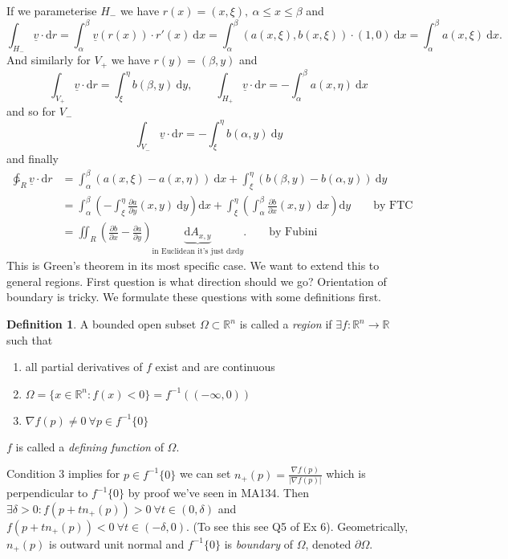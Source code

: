 \documentclass[a4paper]{article}
\theoremstyle{definition}
\newtheorem{defn}{Definition}[subsection]
\begin{document}
If we parameterise $H_{-}$ we have $r(x) = (x,\xi),\ \alpha \leq x\leq \beta$ and
\[
\int_{H_-} \underline v \cdot \mathrm d r = \int_\alpha^\beta \underline v (r(x)) \cdot r'(x) \ \mathrm d x = \int_\alpha^\beta (a(x,\xi),b(x,\xi)) \cdot (1,0) \ \mathrm d x = \int_\alpha^\beta a(x,\xi) \ \mathrm d x .
\]
And similarly for $V_+$ we have $r(y)=(\beta,y)$ and
\[
\int_{V_+} \underline v \cdot \mathrm d r = \int_\xi^\eta b(\beta, y) \ \mathrm d y ,\qquad \int_{H_+} \underline v \cdot \mathrm d r = -\int_\alpha^\beta a(x,\eta) \ \mathrm d x
\]
and so for $V_-$
\[
\int_{V_-} \underline v \cdot \mathrm d r = -\int_\xi^\eta b(\alpha ,y) \ \mathrm d y
\]
and finally
\[
\begin{aligned}
\ointctrclockwise _R \underline v \cdot \mathrm d r &= \int_\alpha^\beta (a(x,\xi)-a(x,\eta)) \ \mathrm d x + \int_\xi^\eta (b(\beta,y)-b(\alpha,y)) \ \mathrm d y \\ &= \int_\alpha^\beta \left( -\int_\xi^\eta \frac{\partial a}{\partial y} (x,y) \ \mathrm d y \right) \mathrm d x+\int_\xi^\eta \left( \int_\alpha^\beta \frac{\partial b}{\partial x} (x,y) \ \mathrm d x \right) \mathrm d y \qquad \text{by FTC} \\
&= \iint_R \left( \frac{\partial b}{\partial x}-\frac{\partial a}{\partial y} \right) \underbrace{\mathrm dA_{x,y}}_{\text{in Euclidean it's just }\mathrm d x \mathrm d y}. \qquad \text{by Fubini}
\end{aligned}
\]
This is Green's theorem in its most specific case. We want to extend this to general regions. First question is what direction should we go? Orientation of boundary is tricky. We formulate these questions with some definitions first.
\begin{defn}
A bounded open subset $\Omega \subset \mathbb R^n$ is called a \textit{region} if $\exists f:\mathbb R^n \rightarrow \mathbb R$ such that
\begin{enumerate}
    \item all partial derivatives of $f$ exist and are continuous
    \item $\Omega = \{x\in \mathbb R^n : f(x) <0\} = f^{-1} ((-\infty,0))$
    \item $\nabla f(p) \neq 0 \ \forall p\in f^{-1}\{0\}$
\end{enumerate}
$f$ is called a \textit{defining function} of $\Omega$.
\end{defn}
Condition 3 implies for $p\in f^{-1}\{0\}$ we can set $n_+ (p) = \frac{\nabla f(p)}{|\nabla f(p)|}$ which is perpendicular to $f^{-1}\{0\}$ by proof we've seen in MA134. Then $\exists \delta >0: f(p+tn_+ (p)) >0 \ \forall t\in (0,\delta)$ and $f(p+tn_+ (p)) <0 \ \forall t\in (-\delta,0)$. (To see this see Q5 of Ex 6). Geometrically, $n_+ (p)$ is outward unit normal and $f^{-1}\{0\}$ is \textit{boundary} of $\Omega$, denoted $\partial \Omega$.
\end{document}
